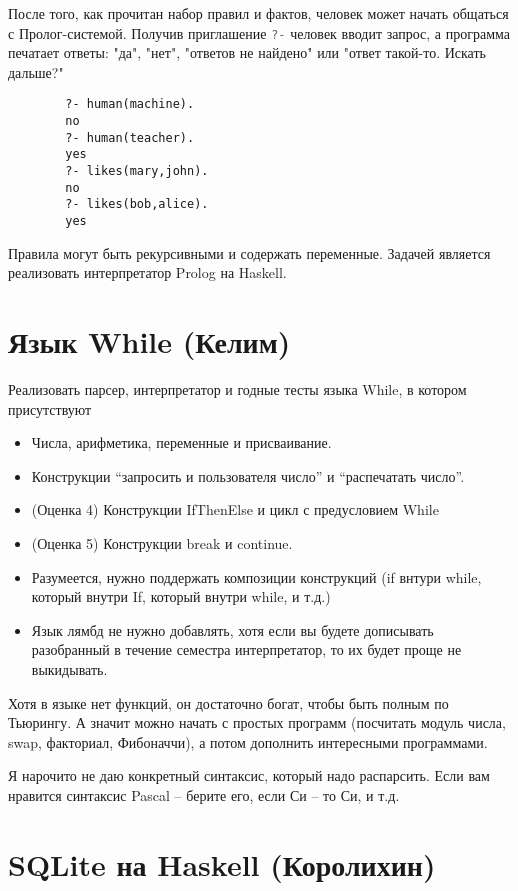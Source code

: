 \documentclass[a4paper,14pt]{article}
\def\hsinline{\lstinline[language=haskell]}
\begin{document}
После того, как прочитан набор правил и фактов, человек может начать общаться с Пролог-системой. Получив приглашение \hsinline=?-= человек вводит запрос, а программа печатает ответы: "да", "нет", "ответов не найдено" или "ответ такой-то. Искать дальше?"

\begin{lstlisting}
        ?- human(machine).
        no
        ?- human(teacher).
        yes
        ?- likes(mary,john).
        no
        ?- likes(bob,alice).
        yes
\end{lstlisting}

Правила могут быть рекурсивными и содержать переменные. Задачей является реализовать интерпретатор Prolog на Haskell. 

\section{Язык While (Келим)}

Реализовать парсер, интерпретатор и годные тесты языка While, в котором присутствуют

\begin{itemize}
 \item Числа, арифметика, переменные и присваивание.
 \item Конструкции ``запросить и пользователя число'' и ``распечатать число''.
 \item (Оценка 4) Конструкции IfThenElse и цикл с предусловием While
 \item (Оценка 5) Конструкции break и continue.
 \item Разумеется, нужно поддержать композиции конструкций (if внтури while, который внутри If, который внутри while, и т.д.)
 \item Язык лямбд не нужно добавлять, хотя если вы будете дописывать разобранный в течение семестра интерпретатор, то их будет проще не выкидывать.
\end{itemize}

Хотя в языке нет функций, он достаточно богат, чтобы быть полным по Тьюрингу. А значит можно начать с простых программ (посчитать модуль числа, swap, факториал, Фибоначчи), а потом дополнить интересными программами.

Я нарочито не даю конкретный синтаксис, который надо распарсить. Если вам нравится синтаксис Pascal -- берите его, если Си -- то Си, и т.д.

\section{SQLite на Haskell (Королихин)}
\end{document}
